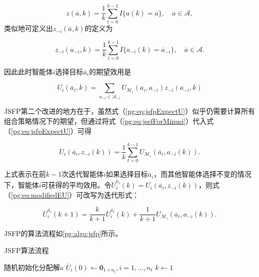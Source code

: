 \begin{equation}
\label{pg:eq:jsef}
	z(\overline a,k) = \frac{1}{k} \sum_{t=0}^{k-1} I\{a(k) = \overline a\},\quad \overline a \in \mathcal{A},
\end{equation}
类似地可定义出$z_{-i}(\overline a,k)$的定义为

\begin{equation}
\label{pg:eq:jsefForMinusi}
	z_{-i}(\overline a_{-i},k) = \frac{1}{k} \sum_{t=0}^{k-1} I\{a_{-i}(k) = \overline a_{-i}\},\quad \overline a \in \mathcal{A}.
\end{equation}

因此此时智能体$i$选择目标$\overline a_i$的期望效用是

\begin{equation}
\label{pg:eq:jsfpExpectU}
	U_i(\overline a_i,k) = \sum_{a_{-i} \in \mathcal{A}_{-i}} U_{\mathcal{M}_i}(\overline a_i,a_{-i}) z_{-i}(\overline a_{-i},k)
\end{equation}

JSFP第二个改进的地方在于，虽然式（\ref{pg:eq:jsfpExpectU}）似乎仍需要计算所有组合策略情况下的期望，但通过将式（\ref{pg:eq:jsefForMinusi}）代入式（\ref{pg:eq:jsfpExpectU}）可得

\begin{equation}
\label{pg:eq:modifiedEU}
	U_i(\overline a_i, z_{-i}(k)) = \frac{1}{k}\sum_{t=0}^{k-1} U_{\mathcal{M}_i}(\overline a_i, a_{-i}(k)).
\end{equation}

上式表示在前$k-1$次迭代智能体$i$如果选择目标$\overline a_i$，而其他智能体选择不变的情况下，智能体$i$可获得的平均效用。令$\overline U_i^{\overline a_i}(k)=U_i(\overline a_i, z_{-i}(k))$，则式（\ref{pg:eq:modifiedEU}）可改写为迭代形式：

\begin{equation}
\label{pg:eq:recurJSFP}
	\overline U_i^{\overline a_i}(k+1) = \frac{k}{k+1} \overline U_i^{\overline a_i}(k) + \frac{1}{k+1} U_{\mathcal{M}_i}(\overline a_i, a_{-i}(k)).
\end{equation}

JSFP的算法流程如\ref{pg:algo:jsfp}所示。

\begin{algorithm}[htb]
	\caption{JSFP算法流程}
	\label{pg:algo:jsfp}
	\small
	\SetAlgoLined
	
	随机初始化分配解$a$\;
	${\overline U}_i(0) \gets {\bm 0}_{1 \times n_t},i=1,\dots,n_t$\;
	$k \gets 1$\;
	
\end{algorithm}


